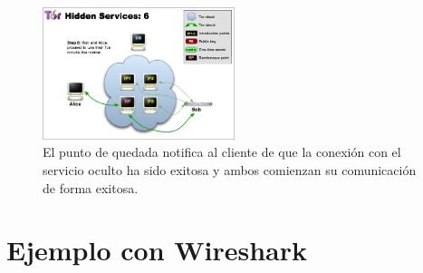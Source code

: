 \documentclass[10pt,a4paper,spanish]{article}
\begin{document}
\begin{figure}[!h]
    \centering
    \includegraphics[width=0.5\textwidth]{THS-6}
    \caption{El punto de quedada notifica al cliente de que la conexión con el servicio oculto ha sido exitosa y ambos comienzan su comunicación de forma exitosa.}
    \label{ths6}
\end{figure}

\section{Ejemplo con Wireshark}

\end{document}
